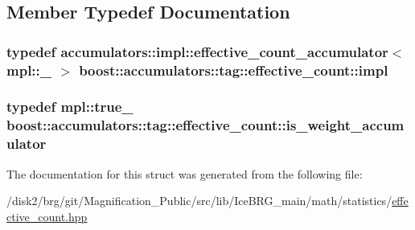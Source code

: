 \subsection{Member Typedef Documentation}
\hypertarget{structboost_1_1accumulators_1_1tag_1_1effective__count_afb8cd525da641f5b3f81759f2c614350}{
\subsubsection[{impl}]{\setlength{\rightskip}{0pt plus 5cm}typedef {\bf accumulators\-::impl\-::effective\-\_\-count\-\_\-accumulator}$<$ mpl\-::\-\_ $>$ {\bf boost\-::accumulators\-::tag\-::effective\-\_\-count\-::impl}}}\label{structboost_1_1accumulators_1_1tag_1_1effective__count_afb8cd525da641f5b3f81759f2c614350}
\hypertarget{structboost_1_1accumulators_1_1tag_1_1effective__count_ac4274fac6b1cf2217291494cd34d67d2}{
\subsubsection[{is\-\_\-weight\-\_\-accumulator}]{\setlength{\rightskip}{0pt plus 5cm}typedef mpl\-::true\-\_\- {\bf boost\-::accumulators\-::tag\-::effective\-\_\-count\-::is\-\_\-weight\-\_\-accumulator}}}\label{structboost_1_1accumulators_1_1tag_1_1effective__count_ac4274fac6b1cf2217291494cd34d67d2}


The documentation for this struct was generated from the following file\-:\begin{DoxyCompactItemize}
\item 
/disk2/brg/git/\-Magnification\-\_\-\-Public/src/lib/\-Ice\-B\-R\-G\-\_\-main/math/statistics/\hyperlink{effective__count_8hpp}{effective\-\_\-count.\-hpp}\end{DoxyCompactItemize}
